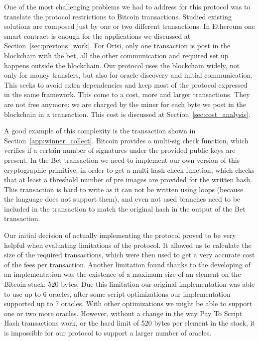 One of the most challenging problems we had to address for this protocol was to
  translate the protocol restrictions to Bitcoin transactions.
Studied existing solutions are composed just by one or two different
  transactions.
In Ethereum one smart contract is enough for the applications we discussed at
  Section~\ref{sec:previous_work}.
For Orisi, only one transaction is post in the blockchain with the bet, all
  the other communication and required set up happens outside the blockchain.
Our protocol uses the blockchain widely, not only for money transfers, but also
  for oracle discovery and initial communication.
This seeks to avoid extra dependencies and keep most of the protocol expressed
  in the same framework.
This come to a cost, more and larger transactions.
They are not free anymore: we are charged by the miner for each byte we post in
  the blockchain in a transaction.
This cost is discussed at Section~\ref{sec:cost_analysis}.

A good example of this complexity is the transaction shown in
  Section~\ref{app:winner_collect}.
Bitcoin provides a multi-sig check function, which verifies if a certain number
  of signatures under the provided public keys are present.
In the Bet transaction we need to implement our own version of this
  cryptographic primitive, in order to get a multi-hash check function, which
  checks that at least a threshold number of pre images are provided for the
  written hash.
This transaction is hard to write as it can not be written using loops (because
  the language does not support them), and even not used branches need to be
  included in the transaction to match the original hash in the output of the
  Bet transaction.

Our initial decision of actually implementing the protocol proved to be very
  helpful when evaluating limitations of the protocol.
It allowed us to calculate the size of the required transactions, which were
  then used to get a very accurate cost of the fees per transaction.
Another limitation found thanks to the developing of an implementation was the
  existence of a maximum size of an element on the Bitcoin stack: 520 bytes.
Due this limitation our original implementation was able to use up to 6 oracles,
  after some script optimizations our implementation supported up to 7 oracles.
With other optimizations we might be able to support one or two more oracles.
However, without a change in the way Pay To Script Hash transactions work, or
  the hard limit of 520 bytes per element in the stack, it is impossible for our
  protocol to support a larger number of oracles.

